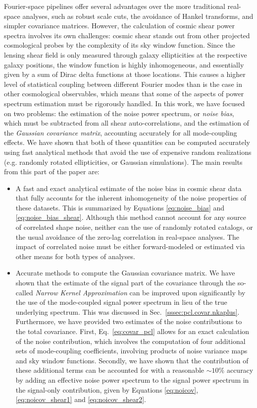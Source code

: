 \documentclass[a4paper,11pt]{article}
\begin{document}
   Fourier-space pipelines offer several advantages over the more traditional real-space analyses, such as robust scale cuts, the avoidance of Hankel transforms, and simpler covariance matrices. However, the calculation of cosmic shear power spectra involves its own challenges: cosmic shear stands out from other projected cosmological probes by the complexity of its sky window function. Since the lensing shear field is only measured through galaxy ellipticities at the respective galaxy positions, the window function is highly inhomogeneous, and essentially given by a sum of Dirac delta functions at those locations. This causes a higher level of statistical coupling between different Fourier modes than is the case in other cosmological observables, which means that some of the aspects of power spectrum estimation must be rigorously handled. In this work, we have focused on two problems: the estimation of the noise power spectrum, or {\sl noise bias}, which must be subtracted from all shear auto-correlations, and the estimation of the {\sl Gaussian covariance matrix}, accounting accurately for all mode-coupling effects. We have shown that both of these quantities can be computed accurately using fast analytical methods that avoid the use of expensive random realizations (e.g. randomly rotated ellipticities, or Gaussian simulations). The main results from this part of the paper are:
    \begin{itemize}
      \item A fast and exact analytical estimate of the noise bias in cosmic shear data that fully accounts for the inherent inhomogeneity of the noise properties of these datasets. This is summarized by Equations \ref{eq:noise_bias} and \ref{eq:noise_bias_shear}. Although this method cannot account for any source of correlated shape noise, neither can the use of randomly rotated catalogs, or the usual avoidance of the zero-lag correlation in real-space analyses. The impact of correlated noise must be either forward-modeled or estimated via other means for both types of analyses. 
      \item Accurate methods to compute the Gaussian covariance matrix. We have shown that the estimate of the signal part of the covariance through the so-called \emph{Narrow Kernel Approximation} can be improved upon significantly by the use of the mode-coupled signal power spectrum in lieu of the true underlying spectrum. This was discussed in Sec.~\ref{sssec:pcl.covar.nkaplus}. Furthermore, we have provided two estimates of the noise contributions to the total covariance. First, Eq.~\ref{eq:covar_pcl} allows for an exact calculation of the noise contribution, which involves the computation of four additional sets of mode-coupling coefficients, involving products of noise variance maps and sky window functions. Secondly, we have shown that the contribution of these additional terms can be accounted for with a reasonable $\sim10\%$ accuracy by adding an effective noise power spectrum to the signal power spectrum in the signal-only contribution, given by Equations \ref{eq:noicov}, \ref{eq:noicov_shear1} and \ref{eq:noicov_shear2}.
    \end{itemize}
\end{document}
